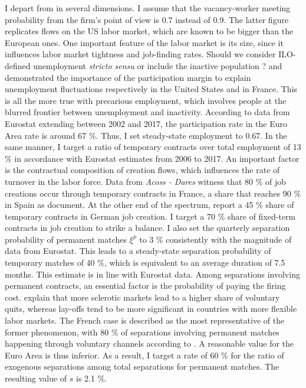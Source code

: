 I depart from \citet{thomas2009labor} in several dimensions. I assume that the vacancy-worker meeting probability from the firm's point of view is 0.7 instead of 0.9. The latter figure replicates flows on the US labor market, which are known to be bigger than the European ones. One important feature of the labor market is its size, since it influences labor market tightness and job-finding rates. Should we consider ILO-defined unemployment \emph{stricto sensu} or include the inactive population ? \citet{elsby2015importance} and \citet{fontaine2016french} demonstrated the importance of the participation margin to explain unemployment fluctuations respectively in the United States and in France. This is all the more true with precarious employment, which involves people at the blurred frontier between unemployment and inactivity. According to data from Eurostat extending between 2002 and 2017, the participation rate in the Euro Area rate is around 67 \%. Thus, I set steady-state employment to 0.67. In the same manner, I target a ratio of temporary contracts over total employment of 13 \% in accordance with Eurostat estimates from 2006 to 2017. An important factor is the contractual composition of creation flows, which influences the rate of turnover in the labor force. Data from \emph{Acoss - Dares} witness that 80 \% of job creations occur through temporary contracts in France, a share that reaches 90 \% in Spain as \citet{RePEc:fda:fdaeee:eee2017-25} document. At the other end of the spectrum, \citet{addison2019worker} report a 45 \% share of temporary contracts in German job creation. I target a 70 \% share of fixed-term contracts in job creation to strike a balance. I also set the quarterly separation probability of permanent matches $\xi^p$ to 3 \% consistently with the magnitude of data from Eurostat. This leads to a steady-state separation probability of temporary matches of 40 \%, which is equivalent to an average duration of 7.5 months. This estimate is in line with Eurostat data. Among separations involving permanent contracts, an essential factor is the probability of paying the firing cost. \citet{jolivet:hal-00279066} explain that more sclerotic markets lead to a higher share of voluntary quits, whereas lay-offs tend to be more significant in countries with more flexible labor markets. The French case is described as the most representative of the former phenomenon, with 80 \% of separations involving permanent matches happening through voluntary channels according to \citet{dares062018}. A reasonable value for the Euro Area is thus inferior. As a result, I target a rate of 60 \% for the ratio of exogenous separations among total separations for permanent matches. The resulting value of $s$ is 2.1 \%.

